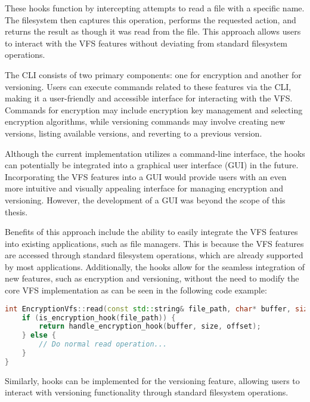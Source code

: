 These hooks function by intercepting attempts to read a file with a specific name.
The filesystem then captures this operation, performs the requested action, and returns the result as though it was read from the file.
This approach allows users to interact with the VFS features without deviating from standard filesystem operations.

The CLI consists of two primary components: one for encryption and another for versioning.
Users can execute commands related to these features via the CLI, making it a user-friendly and accessible interface for interacting with the VFS\@.
Commands for encryption may include encryption key management and selecting encryption algorithms, while versioning commands may involve creating new versions, listing available versions, and reverting to a previous version.

Although the current implementation utilizes a command-line interface, the hooks can potentially be integrated into a graphical user interface (GUI) in the future.
Incorporating the VFS features into a GUI would provide users with an even more intuitive and visually appealing interface for managing encryption and versioning.
However, the development of a GUI was beyond the scope of this thesis.

Benefits of this approach include the ability to easily integrate the VFS features into existing applications, such as file managers.
This is because the VFS features are accessed through standard filesystem operations, which are already supported by most applications.
Additionally, the hooks allow for the seamless integration of new features, such as encryption and versioning, without the need to modify the core VFS implementation as can be seen in the following code example:

\begin{lstlisting}[language=c++, basicstyle=\ttfamily\small]
int EncryptionVfs::read(const std::string& file_path, char* buffer, size_t size, off_t offset) {
    if (is_encryption_hook(file_path)) {
        return handle_encryption_hook(buffer, size, offset);
    } else {
        // Do normal read operation...
    }
}
\end{lstlisting}

Similarly, hooks can be implemented for the versioning feature, allowing users to interact with versioning functionality through standard filesystem operations.




